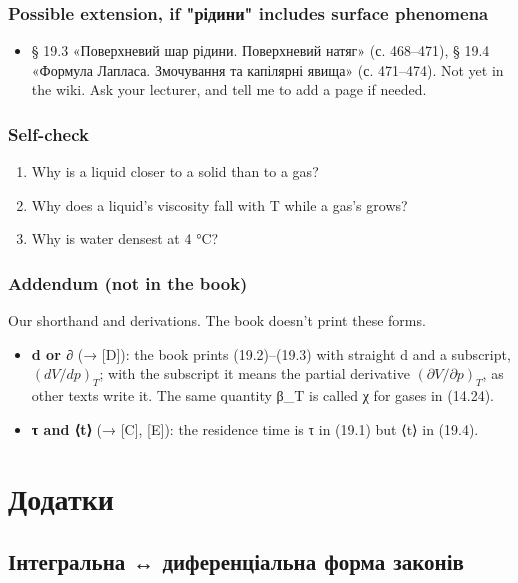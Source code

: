 \documentclass[11pt,a4paper,oneside]{book}
\begin{document}
\section*{Possible extension, if "рідини" includes surface phenomena}
\begin{itemize}
\item § 19.3 «Поверхневий шар рідини. Поверхневий натяг» (с. 468–471), § 19.4 «Формула Лапласа. Змочування та капілярні явища» (с. 471–474). Not yet in the wiki. Ask your lecturer, and tell me to add a page if needed.
\end{itemize}

\section*{Self-check}
\begin{enumerate}
\item Why is a liquid closer to a solid than to a gas?
\item Why does a liquid's viscosity fall with T while a gas's grows?
\item Why is water densest at 4 °C?
\end{enumerate}

\section*{Addendum (not in the book)}
Our shorthand and derivations. The book doesn't print these forms.
\begin{itemize}
\item \textbf{d or ∂} (→ [D]): the book prints (19.2)–(19.3) with straight d and a subscript, $(dV/dp)_T$; with the subscript it means the partial derivative $(\partial V/\partial p)_T$, as other texts write it. The same quantity β\_T is called χ for gases in (14.24).
\item \textbf{τ and ⟨t⟩} (→ [C], [E]): the residence time is τ in (19.1) but ⟨t⟩ in (19.4).
\end{itemize}

\appendix

\part{Додатки}

\chapter*{Інтегральна ↔ диференціальна форма законів}
\end{document}
